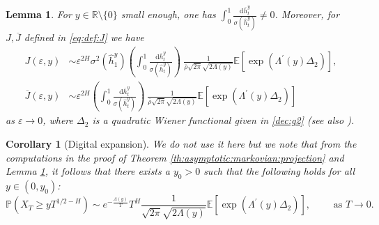 \documentclass[11pt]{article}
\theoremstyle{plain}
\newtheorem{corollary}[theorem]{Corollary}
\newtheorem{lemma}[theorem]{Lemma}
\theoremstyle{definition}
\theoremstyle{remark}
\newcommand{\R}{\mathbb{R}}
\renewcommand{\bar}{\overline}
\renewcommand{\hat}{\widehat}
\newcommand{\dd}{\mathrm{d}}
\newcommand{\bE}{\mathbb{E}}
\newcommand{\bP}{\mathbb{P}}
\newcommand{\1}{\mathbf{1}}
\numberwithin{equation}{section}
\def\eps{\varepsilon}
\begin{document}
\begin{lemma} \label{lem:exact_asymptotics}
For $y\in\R\setminus\{0\}$ {small enough}, one has $\int_0^1 \frac{ \dd \bar{h}^y_t}{ \sigma \left(\hat{h}^y_t \right) } \neq 0$.
Moreover, for $J,\overline{J}$ defined in \eqref{eq:def:J} we have
\label{th:limit:J}
\begin{equation}\label{eq:limit:J}
\begin{split}
J(\eps,y)&\sim \eps^{2H}
\sigma^2 (\hat{h}_1^y)
\left( \int_0^1\frac{\dd \bar{h}_t^y}{\sigma(\hat{h}_t^y) } \right)\
{ \frac{1}{\bar{\rho} \sqrt{2\pi} \sqrt{2 \Lambda(y)} } }
 \bE \left[ \exp\left(\Lambda^{\prime}
 \left( y\right)\Delta_{2}\right) \right],
\\
\overline{J}(\eps,y)&\sim
\eps^{2H}
\left( \int_0^1\frac{\dd \bar{h}_t^y}{\sigma(\hat{h}_t^y) } \right)\
{ \frac{1}{\bar{\rho} \sqrt{2\pi} \sqrt{2 \Lambda(y)} } }
 \bE \left[ \exp\left(\Lambda^{\prime}\left( y\right)\Delta_{2}\right) \right]
\end{split}
\end{equation}
as $\eps \to 0$, where $\Delta_2$ is a quadratic Wiener functional given in 
\eqref{dec:g2} (see also \cite[Equation (7.4)]{friz2018precise1}).
\end{lemma}

\begin{corollary}[Digital expansion] We do not use it here but we note that from the computations in  the proof of Theorem \ref{th:asymptotic:markovian:projection} and Lemma \ref{lem:exact_asymptotics},	it follows that there exists a $y_0>0$ such that the following holds for all $y \in (0,y_0)$:
\[
\bP \left( X_T \geq y T^{1/2-H} \right) \sim 
e^{-\frac{\Lambda (y)}{T}}
T^{H}
{ \frac{1}{\sqrt{2\pi}\sqrt{2 \Lambda(y)} } }
 \bE \left[ \exp\left(\Lambda^{\prime}
 \left( y\right)\Delta_{2}\right) \right],
\qquad
\text{ as  } T \to 0.
\]
\end{corollary}
\end{document}
